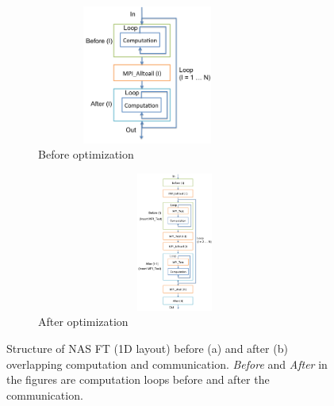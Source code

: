 \begin{figure}
  \centering
  \begin{subfigure}[b]{0.2\textwidth}
    \includegraphics[width=0.8\textwidth,height=1.8in]{fig/ft_loop.png}
    \caption{Before optimization}
    \label{fig:ft_loop}
  \end{subfigure}%
  \hspace{-.3in}
  \begin{subfigure}[b]{0.3\textwidth}
    \includegraphics[width=1.1\textwidth,height=1.8in]{fig/ft_cco.png}
    \caption{After optimization}
    \label{fig:ft_cco}
  \end{subfigure}
  \caption{Structure of NAS FT (1D layout) before (a) and after (b) overlapping computation and communication.
           \emph{Before} and \emph{After} in the figures are computation loops before and after the communication.}
\label{fig:ft}
\end{figure}

